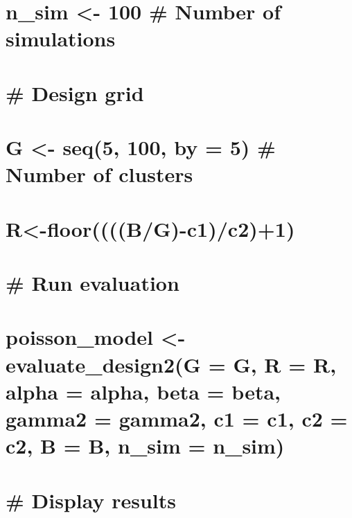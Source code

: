 \documentclass[
]{article}
\begin{document}
\hypertarget{n_sim---100-number-of-simulations}{%
\section{n\_sim \textless- 100 \# Number of
simulations}\label{n_sim---100-number-of-simulations}}

\hypertarget{design-grid}{%
\section{\# Design grid}\label{design-grid}}

\hypertarget{g---seq5-100-by-5-number-of-clusters}{%
\section{G \textless- seq(5, 100, by = 5) \# Number of
clusters}\label{g---seq5-100-by-5-number-of-clusters}}

\hypertarget{r-floorbg-c1c21}{%
\section{R\textless-floor((((B/G)-c1)/c2)+1)}\label{r-floorbg-c1c21}}

\hypertarget{run-evaluation}{%
\section{\# Run evaluation}\label{run-evaluation}}

\hypertarget{poisson_model---evaluate_design2g-g-r-r-alpha-alpha-beta-beta-gamma2-gamma2-c1-c1-c2-c2-b-b-n_sim-n_sim}{%
\section{poisson\_model \textless- evaluate\_design2(G = G, R = R, alpha
= alpha, beta = beta, gamma2 = gamma2, c1 = c1, c2 = c2, B = B, n\_sim =
n\_sim)}\label{poisson_model---evaluate_design2g-g-r-r-alpha-alpha-beta-beta-gamma2-gamma2-c1-c1-c2-c2-b-b-n_sim-n_sim}}

\hypertarget{section-30}{%
\section{}\label{section-30}}

\hypertarget{display-results}{%
\section{\# Display results}\label{display-results}}
\end{document}
